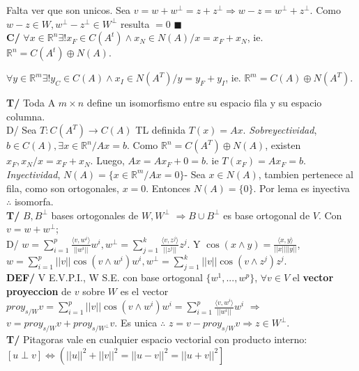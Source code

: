 \documentclass[10pt,a4paper]{article}
\newcommand*{\QEDA}{\null\nobreak\hfill\ensuremath{\blacksquare}}
\begin{document}
\quad Falta ver que son unicos. Sea $v = w + w^\perp = z + z^\perp \Rightarrow w-z = w^\perp + z^\perp$. Como $w-z \in W, w^\perp - z^\perp \in W^\perp$ resulta $=0$ \QEDA\\
\textbf{C/} $\forall x \in \mathbb{R}^n \exists! x_F \in C(A^t) \land x_N \in N(A) / x = x_F + x_N$, ie. $\mathbb{R}^n = C(A^t) \oplus N(A)$.

\qquad $\forall y \in \mathbb{R}^m \exists! y_C \in C(A) \land x_I \in N(A^T) / y = y_F + y_I$, ie. $\mathbb{R}^m = C(A) \oplus N(A^T)$.

\textbf{T/} Toda A $m \times n$ define un isomorfismo entre su espacio fila y su espacio columna.\\
D/ Sea $T: C(A^T) \rightarrow C(A)$ TL definida $T(x) = Ax$. \textit{Sobreyectividad}, $b \in C(A), \exists x \in \mathbb{R}^n / Ax = b$. Como $\mathbb{R}^n = C(A^T) \oplus N(A)$, existen $x_F, x_N / x = x_F + x_N$. Luego, $Ax = Ax_F + 0 = b$. ie $T(x_F) = Ax_F = b$. \textit{Inyectividad}, $N(A) = \{x \in \mathbb{R}^m / Ax = 0\}$- Sea $x \in N(A)$, tambien pertenece al fila, como son ortogonales, $x = 0$. Entonces $N(A) = \{0\}$. Por lema es inyectiva $\therefore$ isomorfa.\\
\textbf{T/} $B, B^\perp$ bases ortogonales de $W, W^\perp$ $\Rightarrow B \cup B^\perp$ es base ortogonal de $V$. Con $v = w + w^\perp$;\\
D/ $w = \sum_{i=1}^p\frac{\langle v,w^i \rangle}{||w^i||}w^i, w^\perp = \sum_{j=1}^k\frac{\langle v,z^j \rangle}{||z^j||}z^j$. Y $\cos(x \wedge y) = \frac{\langle x,y \rangle}{||x||||y||}$, $w = \sum_{i=1}^p ||v||\cos(v\wedge w^i)w^i, w^\perp = \sum_{j=1}^k ||v||\cos(v\wedge z^j)z^j$.\\
\textbf{DEF/} V E.V.P.I., W S.E. con base ortogonal $\{w^1, ..., w^p\}$, $\forall v \in V$ el \textbf{vector proyeccion} de $v$ sobre $W$ es el vector $proy_{s/W}v = \sum_{i=1}^p ||v|| \cos(v \wedge w^i) w^i = \sum_{i=1}^p\frac{\langle v,w^i \rangle}{||w^i||}w^i$ $\Rightarrow$ $v = proy_{s/W}v+proy_{s/W^\perp}v$. Es unica $\therefore$ $z = v - proy_{s/W} v \Rightarrow z \in W^\perp$.\\
\textbf{T/} Pitagoras vale en cualquier espacio vectorial con producto interno: $[u \perp v] \iff \left(||u||^2 + ||v||^2 = ||u-v||^2 = ||u+v||^2 \right]$
\end{document}

